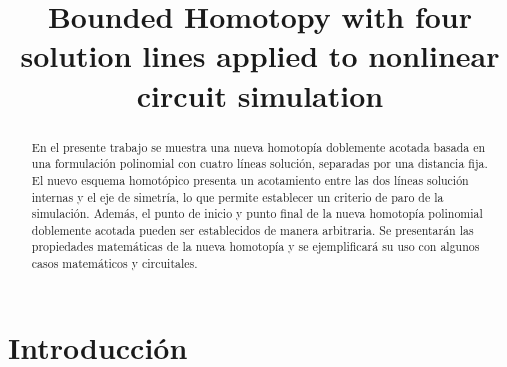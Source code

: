 \documentclass[conference,letterpaper,onecolumn]{IEEEtran}
\begin{document}
\title{Bounded Homotopy with four solution lines applied to nonlinear circuit simulation}


\author{
\and
{}
\and
{}
\and
{}
}


\maketitle

\begin{abstract}

En el presente trabajo se muestra una nueva homotop{\'i}a doblemente acotada basada en una formulaci\'on
polinomial con cuatro l{\'i}neas soluci\'on, separadas por una distancia fija. El nuevo esquema homot\'opico presenta un acotamiento entre las dos l{\'i}neas soluci\'on internas y el eje de simetr{\'i}a, lo que permite
establecer un criterio de paro de la simulaci\'on. Adem\'as, el punto de inicio y punto final de la nueva homotop{\'i}a polinomial doblemente acotada pueden
ser establecidos de manera arbitraria. Se presentar\'an las propiedades matem\'aticas de la nueva homotop{\'i}a
 y se ejemplificar\'a su uso con algunos casos matem\'aticos y circuitales.
\end{abstract}
 

\section{Introducci\'on}
\end{document}
